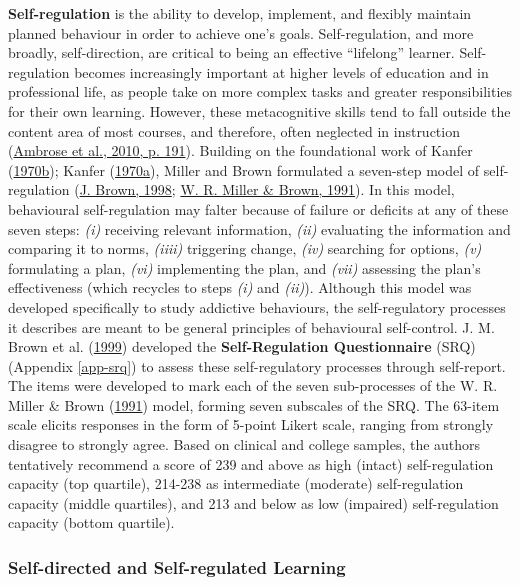 \documentclass[letterpaper, nobind]{templates/ociamthesis}
\begin{document}
\textbf{Self-regulation} is the ability to develop, implement, and flexibly
maintain planned behaviour in order to achieve one's goals.
Self-regulation, and more broadly, self-direction, are critical to being
an effective ``lifelong'' learner. Self-regulation becomes increasingly
important at higher levels of education and in professional life, as
people take on more complex tasks and greater responsibilities for their
own learning. However, these metacognitive skills tend to fall outside
the content area of most courses, and therefore, often neglected in
instruction (\protect\hyperlink{ref-ambrose2010howa}{Ambrose et al., 2010, p. 191}). Building on the foundational work
of Kanfer (\protect\hyperlink{ref-kanfer1970self-a}{1970b}); Kanfer (\protect\hyperlink{ref-kanfer1970self-b}{1970a}), Miller and Brown formulated a
seven-step model of self-regulation (\protect\hyperlink{ref-brown1998self}{J. Brown, 1998}; \protect\hyperlink{ref-miller1991self}{W. R. Miller \& Brown, 1991}).
In this model, behavioural self-regulation may falter because of failure
or deficits at any of these seven steps: \emph{(i)} receiving relevant
information, \emph{(ii)} evaluating the information and comparing it to
norms, \emph{(iiii)} triggering change, \emph{(iv)} searching for options, \emph{(v)}
formulating a plan, \emph{(vi)} implementing the plan, and \emph{(vii)} assessing
the plan's effectiveness (which recycles to steps \emph{(i)} and \emph{(ii)}).
Although this model was developed specifically to study addictive
behaviours, the self-regulatory processes it describes are meant to be
general principles of behavioural self-control.
J. M. Brown et al. (\protect\hyperlink{ref-brown1999self}{1999}) developed the \textbf{Self-Regulation Questionnaire} (SRQ) (Appendix
\ref{app-srq}) to
assess these self-regulatory processes through self-report. The items
were developed to mark each of the seven sub-processes of the
W. R. Miller \& Brown (\protect\hyperlink{ref-miller1991self}{1991}) model, forming seven subscales of the SRQ. The 63-item
scale elicits responses in the form of 5-point Likert scale, ranging
from strongly disagree to strongly agree. Based on clinical and college
samples, the authors tentatively recommend a score of 239 and above as
high (intact) self-regulation capacity (top quartile), 214-238 as
intermediate (moderate) self-regulation capacity (middle quartiles), and
213 and below as low (impaired) self-regulation capacity (bottom
quartile).

\hypertarget{self-directed-and-self-regulated-learning}{%
\subsubsection{Self-directed and Self-regulated Learning}\label{self-directed-and-self-regulated-learning}}
\end{document}
